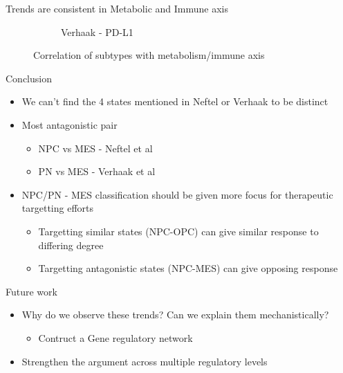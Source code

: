 \documentclass[aspectratio=169,9pt]{beamer}
\begin{document}
\begin{frame}{Trends are consistent in Metabolic and Immune axis}
\begin{adjustwidth}{-5cm}{-5cm}
\begin{figure}
\begin{subfigure}[c]{0.27\textwidth}
                    \caption{Verhaak - PD-L1}
                \end{subfigure}
                \pause[1]\caption{Correlation of subtypes with metabolism/immune axis}
            \end{figure}
        \end{adjustwidth}
    \end{frame}


    \begin{frame}{Conclusion}
        \begin{itemize}
            \item We can't find the 4 states mentioned in Neftel or Verhaak to be distinct
            \pause \item Most antagonistic pair
            \begin{itemize}
                \item NPC vs MES - Neftel et al
                \item PN vs MES - Verhaak et al
            \end{itemize}
            \pause \item NPC/PN - MES classification should be given more focus for therapeutic targetting efforts
            \begin{itemize}
                \item Targetting similar states (NPC-OPC) can give similar response to differing degree
                \item Targetting antagonistic states (NPC-MES) can give opposing response
            \end{itemize}
        \end{itemize}
    \end{frame}

    \begin{frame}{Future work}
        \begin{itemize}
            \item Why do we observe these trends? Can we explain them mechanistically?
            \pause
            \begin{itemize}
                \item Contruct a Gene regulatory network
            \end{itemize}
            \pause
            \item Strengthen the argument across multiple regulatory levels
        \end{itemize}
    \end{frame}
\end{document}
